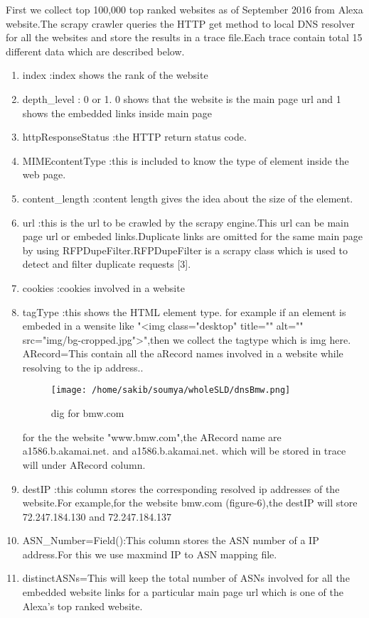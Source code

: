 First we collect top 100,000 top ranked websites as of September 2016 from Alexa website.The scrapy crawler queries the HTTP get method to local DNS resolver for all the websites and store the results in a trace file.Each trace contain total 15 different data which are described below.
\begin{enumerate}
   \item index :index shows the rank of the website
	\item depth\_level : 0 or 1.
			  0 shows that the website is the main page url and 1 shows the embedded links inside main page 
\item httpResponseStatus :the HTTP return status code.
\item MIMEcontentType :this is included to know the type of element inside the web page.
\item content\_length :content length gives the idea about the size of the element.
\item url :this is the url to be crawled by the scrapy engine.This url can be main page url or embeded links.Duplicate links are omitted for the same main page by using RFPDupeFilter.RFPDupeFilter is a scrapy  class which is used to detect and filter duplicate requests [3].
\item cookies :cookies involved in a website
\item tagType :this shows the HTML element type.
		for example if an element is embeded in a wensite like "<img class="desktop" title="" alt="" src="img/bg-cropped.jpg">",then we collect the tagtype which is img here. 
ARecord=This contain all the aRecord names involved in a website while resolving to the ip address..
\begin{figure}[h]
\texttt{[image: /home/sakib/soumya/wholeSLD/dnsBmw.png]}
\centering
\caption{dig for bmw.com}
\end{figure}
for the the website "www.bmw.com",the ARecord name are a1586.b.akamai.net. and a1586.b.akamai.net. which will be stored in trace will under ARecord column.
\item destIP :this column stores the corresponding resolved ip addresses of the website.For example,for the website bmw.com (figure-6),the destIP will store 72.247.184.130 and 72.247.184.137
\item ASN\_Number=Field():This column stores the ASN number of a IP address.For this we use maxmind IP to ASN mapping file.
\item distinctASNs=This will keep the total number of ASNs involved for all the embedded website links for a particular main page url which is one of the Alexa's top ranked website.

\end{enumerate}
